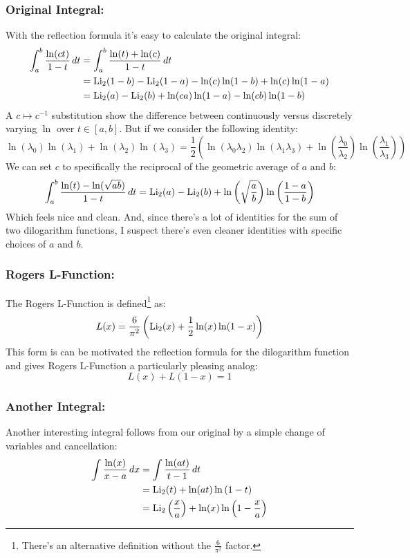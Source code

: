 \subsubsection{Original Integral:}
With the reflection formula it's easy to calculate the original integral:
\[\begin{aligned}
	\int_a^b\frac{\ln(ct)}{1-t}\,dt &=\int_a^b\frac{\ln(t)+\ln(c)}{1-t}\,dt \\
	&= \operatorname{Li}_2(1-b)-\operatorname{Li}_2(1-a)-\ln(c)\ln(1-b)+\ln(c)\ln(1-a)\\
	&= \operatorname{Li}_2(a)-\operatorname{Li}_2(b)+\ln(ca)\ln(1-a)- \ln(cb)\ln(1-b)\\
\end{aligned}\]
A $c\mapsto c^{-1}$ substitution show the difference between continuously versus discretely varying $\ln$ over $t\in[a,b]$.
But if we consider the following identity:
\[\ln(\lambda_0)\ln(\lambda_1)+\ln(\lambda_2)\ln(\lambda_3) = \frac{1}{2}\left(\ln(\lambda_0\lambda_2)\ln(\lambda_1\lambda_3)+\ln\left(\frac{\lambda_0}{\lambda_2}\right)\ln\left(\frac{\lambda_1}{\lambda_3}\right)\right)\]
We can set $c$ to specifically the reciprocal of the geometric average of $a$ and $b$:
\[
\int_a^b\frac{\ln(t)-\ln(\sqrt{ab})}{1-t}\,dt =\operatorname{Li}_2(a)-\operatorname{Li}_2(b)+\ln\left(\sqrt{\frac{a}{b}}\right)\ln\left(\frac{1-a}{1-b}\right) \]
Which feels nice and clean.
And,
since there's a lot of identities for the sum of two dilogarithm functions,
I suspect there's even cleaner identities with specific choices of $a$ and $b$. 

\subsubsection{Rogers L-Function:}
The Rogers L-Function is defined\footnote{There's an alternative definition without the $\frac{6}{\pi^2}$ factor.} as:
\[L(x) = \frac{6}{\pi^2}\left(\operatorname{Li}_2(x)+\frac{1}{2}\ln(x)\ln(1-x)\right)\]
This form is can be motivated the reflection formula for the dilogarithm function and gives Rogers L-Function a particularly pleasing analog:
\[L(x)+L(1-x) = 1\]

\subsubsection{Another Integral:}
Another interesting integral follows from our original by a simple change of variables and cancellation:
\[\begin{aligned}
\int\frac{\ln(x)}{x-a}\,dx&=\int\frac{\ln(at)}{t-1}\,dt\\
&= \operatorname{Li}_2(t)+\ln(at)\ln\left(1-t\right)\\
&= \operatorname{Li}_2\left(\frac{x}{a}\right)+\ln(x)\ln\left(1-\frac{x}{a}\right)\\
\end{aligned}\]
